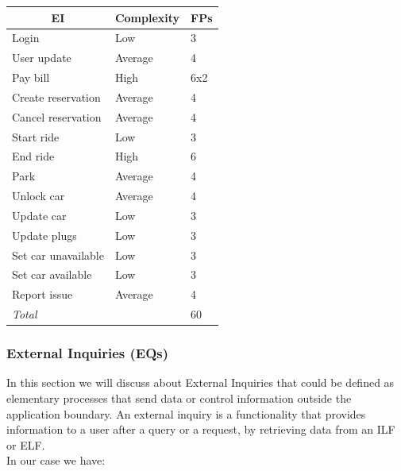 \documentclass[english]{article}
\begin{document}
	\begin{center}
	\begin{tabular}{ |p{8cm}|m{2cm}|p{1cm}| }
		\hline
		\multicolumn{1}{|c|}{\textbf{EI}} & \multicolumn{1}{c|}{\textbf{Complexity}} & \multicolumn{1}{c|}{\textbf{FPs}} \\
		\hline
		Login & Low & 3 \\
		\hline
		User update & Average & 4\\
		\hline
		Pay bill & High & 6x2\\
		\hline
		Create reservation & Average & 4\\
		\hline
		Cancel reservation & Average & 4\\
		\hline
		Start ride & Low & 3\\
		\hline
		End ride & High & 6\\
		\hline
		Park & Average & 4\\
		\hline
		Unlock car & Average & 4\\
		\hline
		Update car & Low & 3\\
		\hline
		Update plugs & Low & 3\\
		\hline
		Set car unavailable & Low & 3\\
		\hline
		Set car available & Low & 3\\
		\hline
		Report issue & Average & 4\\
		\hline
		\multicolumn{2}{|l|}{\textit{Total}} & \multicolumn{1}{l|}{60}\\
		\hline
	\end{tabular}
\end{center}

\subsubsection{External Inquiries (EQs)}

In this section we will discuss about External Inquiries that could be defined as elementary processes that send data or control information outside the application boundary. An external inquiry is a functionality that provides information to a user after a query or a request, by retrieving data from an ILF or ELF. \\
In our case we have: 
\end{document}
